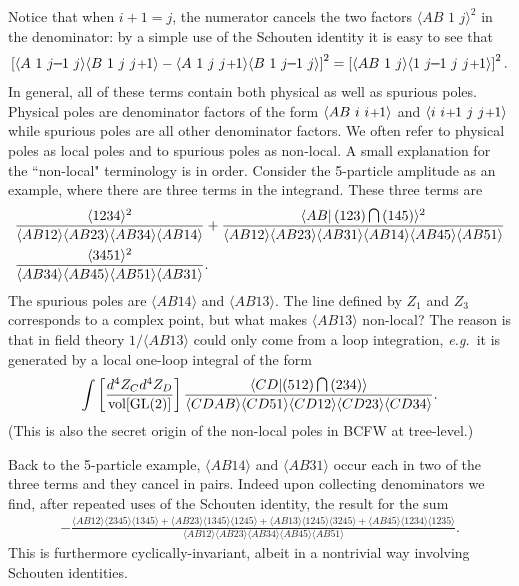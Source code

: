\documentclass[11pt, reqno]{article}
\newcommand{\be}{\begin{eqnarray}}
\newcommand{\ee}{\end{eqnarray}}
\newcommand{\smallminus}{{\rm\rule[2.4pt]{6pt}{0.65pt}}}
\newcommand{\smallplus}{\hspace{0.5pt}\text{{\small+}}\hspace{-0.5pt}}
\renewcommand{\cap}{\mathrm{\raisebox{0.75pt}{{$\,\bigcap\,$}}}}
\newcommand{\ab}[1]{\langle #1\rangle}
\begin{document}
Notice that when $i+1 = j$, the numerator cancels the two factors $\ab{AB\,\,1\,\,j}^2$ in the denominator: by a simple use of the Schouten identity it is easy to see that \be\left[\ab{A\,\,1\,\,j\smallminus1\,\,j}\ab{B\,\,1\,\,j\,\,j\smallplus1}-\ab{A\,\,1\,\,j\,\,j\smallplus1}\ab{B\,\,1\,\,j\smallminus1\,\,j}\right]^2=\left[\ab{AB\,\,1\,\,j}\ab{1\,\,j\smallminus1\,\,j\,\,j\smallplus1}\right]^2.\ee In general, all of these terms contain both physical as well as spurious poles. Physical poles are denominator factors of the form $\langle AB\,\,i\,\,i\smallplus1\rangle$ and $\langle i\,\,i\smallplus1\,\,j\,\,j\smallplus1\rangle$ while spurious poles are all other denominator factors. We often refer to physical poles as local poles and to spurious poles as non-local. A small explanation for the ``non-local" terminology is in order. Consider the 5-particle amplitude as an example, where there are three terms in the integrand.
These three terms are \be \begin{split}
  &\frac{\ab{1234}^2}{ \ab{ AB12}\ab{AB 23}\ab{AB34}\ab{AB14}} +
     \frac{\ab{AB| \,(12 3) \cap (1  4  5)}^2}{\ab{AB12}\ab{AB23} \ab{AB  31}  \ab{AB14}\ab{AB  4  5}\ab{AB  5  1} }
\\
 & \frac{\ab{3451}^2}{ \ab{ AB34}\ab{AB 45}\ab{AB51}\ab{AB31}}. \end{split} \ee
The spurious poles are $\ab{AB14}$ and $\ab{AB13}$. The line defined by $Z_1$ and $Z_3$ corresponds to a complex point, but what makes $\ab{AB13}$ non-local? The reason is that in field theory $1/\ab{AB13}$ could only come from a loop integration, {\it e.g.}~it is generated by a local one-loop integral of the form
%
\be
\int\left[\frac{d^4Z_C d^4Z_D}{{\rm vol[GL(2)]}}\right]
\frac{\langle CD|(512)\cap (234) \rangle}{\langle CD AB\rangle \langle CD 51
\rangle \langle CD 12 \rangle \langle CD 23 \rangle\langle CD 34 \rangle}.
\ee
%
(This is also the secret origin of the non-local poles in BCFW at tree-level.)

Back to the 5-particle example, $\ab{AB14}$ and $\ab{AB31}$ occur each in two of the three terms and they cancel in pairs. Indeed upon
collecting denominators we find, after repeated uses of the Schouten identity, the result for the sum
\be - \frac{\ab{AB12}\ab{2345}\ab{1345} + \ab{AB23}\ab{1345}\ab{1245} + \ab{AB13}\ab{1245}\ab{3245} + \ab{AB45}\ab{1234}\ab{1235}}
{\ab{ AB12}\ab{AB 23}\ab{AB34}\ab{AB45}\ab{AB51}}.
\ee
This is furthermore cyclically-invariant,
albeit in a nontrivial way involving Schouten identities.
\end{document}
